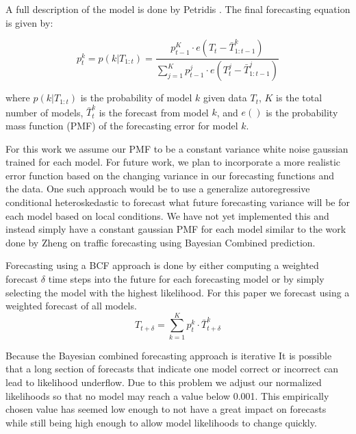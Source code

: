 \documentclass{acm_proc_article-sp}
\begin{document}
A full description of the model is done by Petridis \cite{Petridis2001}.  The final forecasting equation is given by:

\begin{equation}
\label{eq:model_prob}
p_{t}^{k} = p(k|T_{1:t}) = \frac{p_{t - 1}^{K} \cdot e(T_{t} - \bar{T}_{1:t-1}^{k})}{\sum_{j=1}^{K}p_{t - 1}^{j} \cdot e(T_{t}^{j} - \bar{T}_{1:t-1}^{j})}
\end{equation}

\noindent
where $p(k|T_{1:t})$ is the probability of model $k$ given data $T_{t}$, $K$ is the total number of models, $\bar{T}_{t}^{k}$ is the forecast from model $k$, and $e()$ is the probability mass function (PMF) of the forecasting error for model $k$.  

For this work we assume our PMF to be a constant variance white noise gaussian trained for each model.  For future work, we plan to incorporate a more realistic error function based on the changing variance in our forecasting functions and the data.  One such approach would be to use a generalize autoregressive conditional heteroskedastic to forecast what future forecasting variance will be for each model based on local conditions.  We have not yet implemented this and instead simply have a constant gaussian PMF for each model similar to the work done by Zheng \cite{Zheng2006} on traffic forecasting using Bayesian Combined prediction. 

Forecasting using a BCF approach is done by either computing a weighted forecast $\delta$ time steps into the future for each forecasting model or by simply selecting the model with the highest likelihood.  For this paper we forecast using a weighted forecast of all models.  
\begin{equation}
T_{t + \delta} = \sum_{k=1}^{K}p_{t}^{k} \cdot \bar{T}_{t + \delta}^{k}
\end{equation}

Because the Bayesian combined forecasting approach is iterative It is possible that a long section of forecasts that indicate one model correct or incorrect can lead to likelihood underflow.  Due to this problem we adjust our normalized likelihoods so that no model may reach a value below 0.001.  This empirically chosen value has seemed low enough to not have a great impact on forecasts while still being high enough to allow model likelihoods to change quickly.
\end{document}
